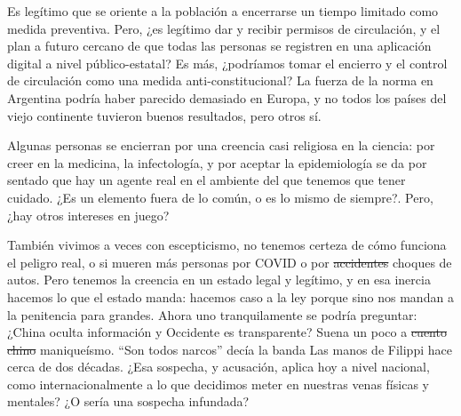 Es legítimo que se oriente a la población a encerrarse un tiempo limitado como medida preventiva.
Pero, ¿es legítimo dar y recibir permisos de circulación, 
y el plan a futuro cercano de que todas las personas se registren en una aplicación digital a nivel público-estatal? 
%
Es más, ¿podríamos tomar el encierro y el control de circulación como una medida anti-constitucional?
La fuerza de la norma en Argentina podría haber parecido demasiado en Europa, 
y no todos los países del viejo continente tuvieron buenos resultados, pero otros sí.

Algunas personas se encierran por una creencia casi religiosa en la ciencia: 
por creer en la medicina, la infectología, y por aceptar la epidemiología se da
por sentado que hay un agente real en el ambiente del que tenemos que tener cuidado. 
¿Es un elemento fuera de lo común, o es lo mismo de siempre?.
Pero, ¿hay otros intereses en juego?

%

También vivimos a veces con escepticismo, no tenemos certeza de cómo funciona el peligro real, 
o si mueren más personas por COVID o por \sout{accidentes} choques de autos.
Pero tenemos la creencia en un estado legal y legítimo, y en esa inercia hacemos lo que el estado manda: 
hacemos caso a la ley porque sino nos mandan a la penitencia para grandes. 
%
Ahora uno tranquilamente se podría preguntar:
¿China oculta información y Occidente es transparente? 
Suena un poco a \sout{cuento chino} maniqueísmo. 
``Son todos narcos'' decía la banda Las manos de Filippi hace cerca de dos décadas. 
¿Esa sospecha, y acusación, aplica hoy a nivel nacional, como internacionalmente a lo que decidimos meter en nuestras venas físicas y mentales? ¿O sería una sospecha infundada?

